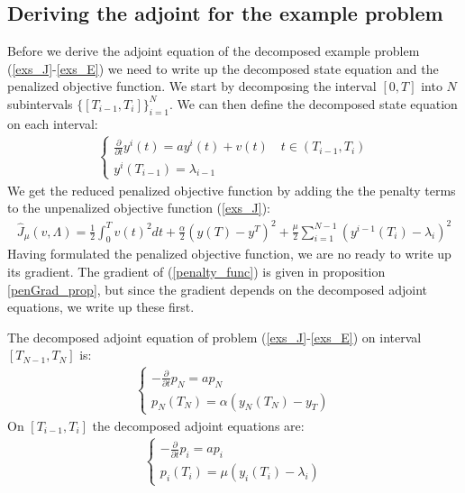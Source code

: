\subsection{Deriving the adjoint for the example problem}
Before we derive the adjoint equation of the decomposed example problem (\ref{exs_J}-\ref{exs_E}) we need to write up the decomposed state equation and the penalized objective function. We start by decomposing the interval $[0,T]$ into $N$ subintervals $\{[T_{i-1},T_{i}]\}_{i=1}^{N}$. We can then define the decomposed state equation on each interval:
\begin{align}
\left\{
     \begin{array}{lr}
       	\frac{\partial}{\partial t} y^i(t)=a y^i(t) + v(t) \quad t\in(T_{i-1},T_{i})\\
       	y^i(T_{i-1})=\lambda_{i-1}
     \end{array}
   \right. \label{decomp_E}
\end{align}
We get the reduced penalized objective function by adding the the penalty terms to the unpenalized objective function (\ref{exs_J}):
\begin{align}
\hat J_{\mu}(v,\Lambda) = \frac{1}{2}\int_0^Tv(t)^2dt + \frac{\alpha}{2}(y(T)-y^T)^2 + \frac{\mu}{2}\sum_{i=1}^{N-1}(y^{i-1}(T_i)-\lambda_i)^2 \label{penalty_func}
\end{align}
Having formulated the penalized objective function, we are no ready to write up its gradient. The gradient of (\ref{penalty_func}) is given in proposition \ref{penGrad_prop}, but since the gradient depends on the decomposed adjoint equations, we write up these first.
\begin{proposition} \label{pen_adjoint_prop}
The decomposed adjoint equation of problem (\ref{exs_J}-\ref{exs_E}) on interval $[T_{N-1},T_N]$ is:
\begin{align}
\left\{
     \begin{array}{lr}
	-\frac{\partial }{\partial t}p_N =a p_N  \\
	p_N(T_{N}) = \alpha( y_N(T_{N})-y_T)
	\end{array}
   \right. \label{end adjoint}
\end{align}
On $[T_{i-1},T_i]$ the decomposed adjoint equations are:
\begin{align}
\left\{
     \begin{array}{lr}
	-\frac{\partial }{\partial t}p_i =ap_i  \\
	p_i(T_{i}) = \mu(y_{i}(T_{i})-\lambda_{i} )
	\end{array}
   \right. \label{exs_adjoint}
\end{align}
\end{proposition} 
